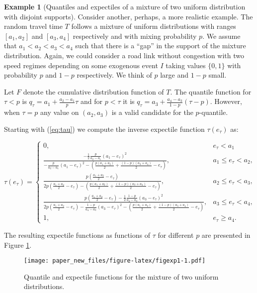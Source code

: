 \documentclass[
]{article}
\theoremstyle{definition}
\theoremstyle{definition}
\newtheorem{example}{Example}[section]
\theoremstyle{definition}
\theoremstyle{definition}
\theoremstyle{remark}
\begin{document}
\begin{example}[Quantiles and expectiles of a mixture of two uniform distribution with disjoint supports]
\protect\hypertarget{exm:duqande}{}\label{exm:duqande}Consider another, perhaps, a more realistic example. The random travel time \(T\) follows a mixture of uniform distributions with ranges \([a_1,a_2]\) and \([a_3, a_4]\) respectively and with mixing probability \(p\). We assume that \(a_1<a_2<a_3<a_4\) such that there is a ``gap'' in the support of the mixture distribution. Again, we could consider a road link without congestion with two speed regimes depending on some exogenous event \(I\) taking values \(\{0,1\}\) with probability \(p\) and \(1-p\) respectively. We think of \(p\) large and \(1-p\) small.

Let \(F\) denote the cumulative distribution function of \(T\). The quantile function for \(\tau <p\) is \(q_\tau = a_1 + \frac{a_2-a_1} p\tau\) and for \(p<\tau\) it is \(q_\tau = a_3 + \frac{a_4-a_3}{1-p}(\tau-p)\). However, when \(\tau=p\) any value on \((a_2,a_3)\) is a valid candidate for the \(p\)-quantile.

Starting with (\eqref{eq:tau}) we compute the inverse expectile function \(\tau(e_\tau)\) as:

\[
\tau(e_\tau)=\begin{cases}
0, &e_\tau<a_1\\
\frac{-\frac 12 \frac{p}{a_2-a_1}(a_1-e_\tau)^2}{-\frac{p}{a_2-a_1}(a_1-e_\tau)^2    -(\frac{p(a_1+a_2)}2 + \frac{(1-p)(a_3+a_4)}2 - e_\tau)}, & a_1\leq e_\tau<a_2,\\
\frac{p\left(\frac{a_1 + a_2}2 - e_\tau\right)}{2p\left(\frac{a_1 + a_2}2 - e_\tau\right)  -(\frac{p(a_1+a_2)}2 + \frac{(1-p)(a_3+a_4)}2 - e_\tau)}, & a_2\leq e_\tau<a_3,\\
\frac{p\left(\frac{a_1 + a_2}2 - e_\tau\right)-\frac 12 \frac{1-p}{a_4-a_3}(a_3-e_\tau)^2}{2p\left(\frac{a_1 + a_2}2 - e_\tau\right)-\frac{1-p}{a_4-a_3}(a_3-e_\tau)^2   -(\frac{p(a_1+a_2)}2 + \frac{(1-p)(a_3+a_4)}2 - e_\tau)}, & a_3\leq e_\tau<a_4,\\
1, &e_\tau\geq a_4.
\end{cases}\]

The resulting expectile functions as functions of \(\tau\) for different \(p\) are presented in Figure \ref{fig:figexp1}.

\begin{figure}
\centering
\texttt{[image: paper\_new\_files/figure-latex/figexp1-1.pdf]}
\caption{\label{fig:figexp1}Quantile and expectile functions for the mixture of two uniform distributions.}
\end{figure}


\end{example}
\end{document}
